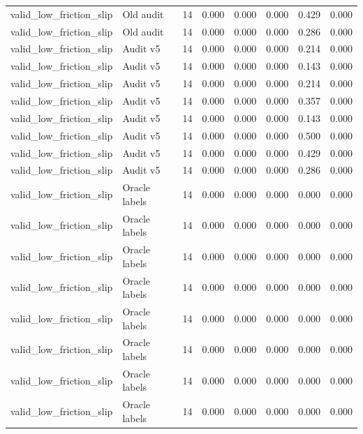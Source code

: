 {\begin{longtable}{llrrrrrr}
valid\_low\_friction\_slip & Old audit & 14 & 0.000 & 0.000 & 0.000 & 0.429 & 0.000 \\
valid\_low\_friction\_slip & Old audit & 14 & 0.000 & 0.000 & 0.000 & 0.286 & 0.000 \\
valid\_low\_friction\_slip & Audit v5 & 14 & 0.000 & 0.000 & 0.000 & 0.214 & 0.000 \\
valid\_low\_friction\_slip & Audit v5 & 14 & 0.000 & 0.000 & 0.000 & 0.143 & 0.000 \\
valid\_low\_friction\_slip & Audit v5 & 14 & 0.000 & 0.000 & 0.000 & 0.214 & 0.000 \\
valid\_low\_friction\_slip & Audit v5 & 14 & 0.000 & 0.000 & 0.000 & 0.357 & 0.000 \\
valid\_low\_friction\_slip & Audit v5 & 14 & 0.000 & 0.000 & 0.000 & 0.143 & 0.000 \\
valid\_low\_friction\_slip & Audit v5 & 14 & 0.000 & 0.000 & 0.000 & 0.500 & 0.000 \\
valid\_low\_friction\_slip & Audit v5 & 14 & 0.000 & 0.000 & 0.000 & 0.429 & 0.000 \\
valid\_low\_friction\_slip & Audit v5 & 14 & 0.000 & 0.000 & 0.000 & 0.286 & 0.000 \\
valid\_low\_friction\_slip & Oracle labels & 14 & 0.000 & 0.000 & 0.000 & 0.000 & 0.000 \\
valid\_low\_friction\_slip & Oracle labels & 14 & 0.000 & 0.000 & 0.000 & 0.000 & 0.000 \\
valid\_low\_friction\_slip & Oracle labels & 14 & 0.000 & 0.000 & 0.000 & 0.000 & 0.000 \\
valid\_low\_friction\_slip & Oracle labels & 14 & 0.000 & 0.000 & 0.000 & 0.000 & 0.000 \\
valid\_low\_friction\_slip & Oracle labels & 14 & 0.000 & 0.000 & 0.000 & 0.000 & 0.000 \\
valid\_low\_friction\_slip & Oracle labels & 14 & 0.000 & 0.000 & 0.000 & 0.000 & 0.000 \\
valid\_low\_friction\_slip & Oracle labels & 14 & 0.000 & 0.000 & 0.000 & 0.000 & 0.000 \\
valid\_low\_friction\_slip & Oracle labels & 14 & 0.000 & 0.000 & 0.000 & 0.000 & 0.000 \\
\bottomrule
\end{longtable}
}

